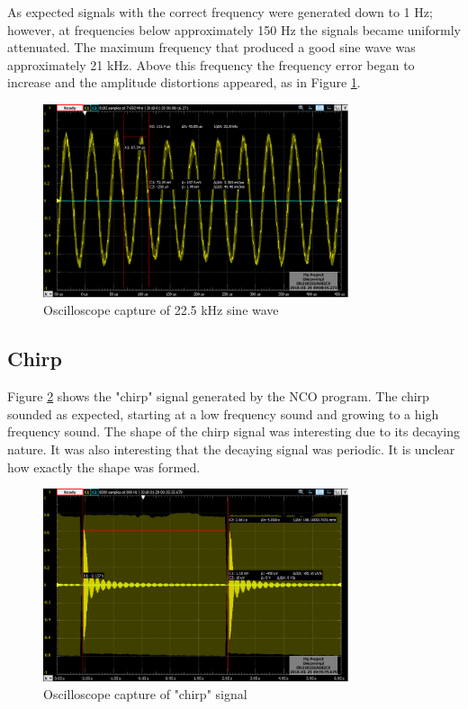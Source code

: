 \documentclass[11pt,pdftex,portrait,letterpaper]{article}
\begin{document}
As expected signals with the correct frequency were generated down to 1 Hz; however, at frequencies below approximately 150 Hz the signals became uniformly attenuated. The maximum frequency that produced a good sine wave was approximately 21 kHz. Above this frequency the frequency error began to increase and the amplitude distortions appeared, as in Figure \ref{f:fig3}. 

\begin{figure}[h]
\centering
\includegraphics[width=0.8\textwidth]{./22500hzOscope}
\caption{Oscilloscope capture of 22.5 kHz sine wave}
\label{f:fig3}
\end{figure}

\subsection{Chirp}

Figure \ref{f:fig4} shows the "chirp" signal generated by the NCO program. The chirp sounded as expected, starting at a low frequency sound and growing to a high frequency sound. The shape of the chirp signal was interesting due to its decaying nature. It was also interesting that the decaying signal was periodic. It is unclear how exactly the shape was formed.

\begin{figure}[h]
\centering
\includegraphics[width=0.8\textwidth]{./chirp}
\caption{Oscilloscope capture of "chirp" signal}
\label{f:fig4}
\end{figure}
\end{document}
